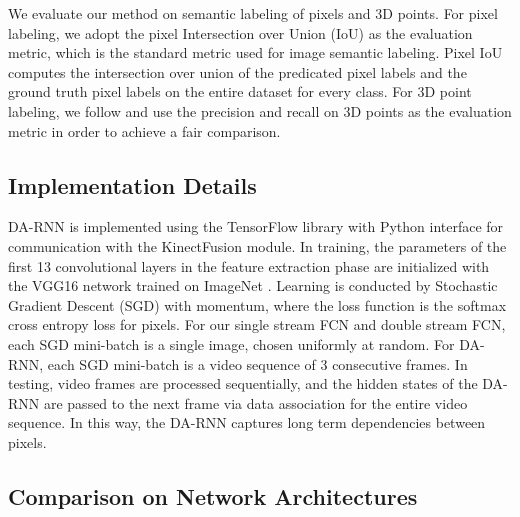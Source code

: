 \documentclass[conference]{IEEEtran}
\begin{document}
We evaluate our method on semantic labeling of pixels and 3D points. For pixel labeling, we adopt the pixel Intersection over Union (IoU) as the evaluation metric, which is the standard metric used for image semantic labeling. Pixel IoU computes the intersection over union of the predicated pixel labels and the ground truth pixel labels on the entire dataset for every class. For 3D point labeling, we follow \cite{lai2014unsupervised} and use the precision and recall on 3D points as the evaluation metric in order to achieve a fair comparison.

\subsection{Implementation Details}

DA-RNN is implemented using the TensorFlow library \cite{abadi2016tensorflow} with Python interface for communication with the KinectFusion module. In training, the parameters of the first 13 convolutional layers in the feature extraction phase are initialized with the VGG16 network \cite{simonyan2014very} trained on ImageNet \cite{deng2009imagenet}. Learning is conducted by Stochastic Gradient Descent (SGD) with momentum, where the loss function is the softmax cross entropy loss for pixels. For our single stream FCN and double stream FCN, each SGD mini-batch is a single image, chosen uniformly at random. For DA-RNN, each SGD mini-batch is a  video sequence of 3 consecutive frames. In testing, video frames are processed sequentially, and the hidden states of the DA-RNN are passed to the next frame via data association for the entire video sequence. In this way, the DA-RNN captures long term dependencies between pixels.

\subsection{Comparison on Network Architectures}
\end{document}
